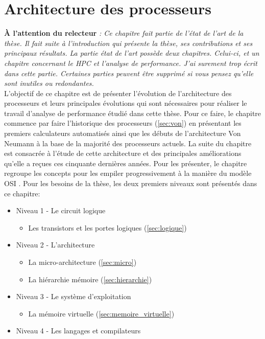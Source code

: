 \chapter{Architecture des processeurs}
\label{chap:sota:materiel}
\minitoc


\textbf{À l'attention du relecteur} \textit{: Ce chapitre fait partie de l'état de l'art de la thèse. Il fait suite à l'introduction qui présente la thèse, ses contributions et ses principaux résultats. La partie état de l'art possède deux chapitres. Celui-ci, et un chapitre concernant le HPC et l'analyse de performance. J'ai surement trop écrit dans cette partie. Certaines parties peuvent être supprimé si vous pensez qu'elle sont inutiles ou redondantes.}\\


L'objectif de ce chapitre est de présenter l'évolution de l'architecture des processeurs et leurs principales évolutions qui sont nécessaires pour réaliser le travail d'analyse de performance étudié dans cette thèse. 
Pour ce faire, le chapitre commence par faire l'historique des processeurs (\autoref{sec:von}) en présentant les premiers calculateurs automatisés ainsi que les débuts de l'architecture Von Neumann à la base de la majorité des processeurs actuels. 
La suite du chapitre est consacrée à l'étude de cette architecture et des principales améliorations qu'elle a reçues ces cinquante dernières années. Pour les présenter, le chapitre regroupe les concepts pour les empiler progressivement à la manière du modèle OSI   \cite{day1983osi}. Pour les besoins de la thèse, les deux premiers niveaux sont présentés dans ce chapitre:
\begin{itemize}
    \item Niveau 1 - Le circuit logique 
        \begin{itemize}
        \item Les transistors et les portes logiques (\autoref{sec:logique})
        \end{itemize}
    \item Niveau 2 - L'architecture 
    \begin{itemize}
        \item La micro-architecture (\autoref{sec:micro})
        \item La hiérarchie mémoire (\autoref{sec:hierarchie})
    \end{itemize}
    \item Niveau 3 - Le système d'exploitation
        \begin{itemize}
            \item La mémoire virtuelle  (\autoref{sec:memoire_virtuelle})
        \end{itemize}
    \item Niveau 4 - Les langages et compilateurs
\end{itemize}

